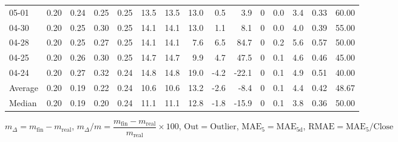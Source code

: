 \begin{threeparttable}
{\begin{tabular}{lrrrrrrrrrrrrrr}
  05-01 &          0.20 &          0.24 &          0.25 &        0.25 &                13.5 &               13.5 &                13.0 &        0.5 &          3.9 &              0 &                 0.0 &              3.4 &            0.33 &                  60.00 \\
  04-30 &          0.20 &          0.25 &          0.30 &        0.25 &                14.1 &               14.1 &                13.0 &        1.1 &          8.1 &              0 &                 0.0 &              4.0 &            0.39 &                  55.00 \\
  04-28 &          0.20 &          0.25 &          0.27 &        0.25 &                14.1 &               14.1 &                 7.6 &        6.5 &         84.7 &              0 &                 0.2 &              5.6 &            0.57 &                  50.00 \\
  04-25 &          0.20 &          0.26 &          0.30 &        0.25 &                14.7 &               14.7 &                 9.9 &        4.7 &         47.5 &              0 &                 0.1 &              4.6 &            0.46 &                  45.00 \\
  04-24 &          0.20 &          0.27 &          0.32 &        0.24 &                14.8 &               14.8 &                19.0 &       -4.2 &        -22.1 &              0 &                 0.1 &              4.9 &            0.51 &                  40.00 \\
Average &          0.20 &          0.19 &          0.22 &        0.24 &                10.6 &               10.6 &                13.2 &       -2.6 &         -8.4 &              0 &                 0.1 &              4.4 &            0.42 &                  48.67 \\
 Median &          0.20 &          0.19 &          0.20 &        0.24 &                11.1 &               11.1 &                12.8 &       -1.8 &        -15.9 &              0 &                 0.1 &              3.8 &            0.36 &                  50.00 \\
\bottomrule
\end{tabular}
}
\begin{tablenotes}\footnotesize
\item $m_\Delta=m_{\text{fin}}-m_{\text{real}}$,
$m_\Delta/m=\dfrac{m_{\text{fin}}-m_{\text{real}}}{m_{\text{real}}}\times100$,
$\mathrm{Out}=\text{Outlier}$,
$\mathrm{MAE}_5=\mathrm{MAE}_{5\text{d}}$,
$\mathrm{RMAE}=\mathrm{MAE}_5/\text{Close}$
\end{tablenotes}
\end{threeparttable}
\endgroup

